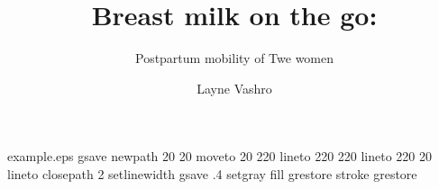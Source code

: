 %
%
%
%
%
\begin{filecontents*}{example.eps}
gsave
newpath
  20 20 moveto
  20 220 lineto
  220 220 lineto
  220 20 lineto
closepath
2 setlinewidth
gsave
  .4 setgray fill
grestore
stroke
grestore
\end{filecontents*}
%
\RequirePackage{fix-cm}
%
\documentclass[smallextended]{svjour3}       %
%
\smartqed  %
%
\usepackage{graphicx}
%
%
%
%
%


\title{Breast milk on the go:%
}
\subtitle{Postpartum mobility of Twe women}


\author{Layne Vashro
}



